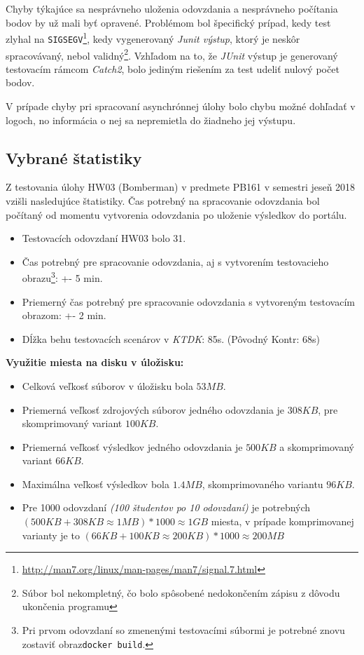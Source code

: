 \documentclass[
  digital, %
  twoside, %
  table,   %
  lof,     %
  lot,     %
]{fithesis3}
\begin{document}
Chyby týkajúce sa nesprávneho uloženia odovzdania a nesprávneho počítania bodov by už mali byť opravené. Problémom bol špecifický prípad, kedy test zlyhal na \texttt{SIGSEGV}\footnote{\url{http://man7.org/linux/man-pages/man7/signal.7.html}}, kedy vygenerovaný \emph{Junit výstup}, ktorý je neskôr spracovávaný, nebol validný\footnote{Súbor bol nekompletný, čo bolo spôsobené nedokončením zápisu z dôvodu ukončenia programu}. Vzhľadom na to, že \emph{JUnit} výstup je generovaný testovacím rámcom \emph{Catch2}, bolo jediným riešením za test udeliť nulový počet bodov.

V prípade chyby pri spracovaní asynchrónnej úlohy bolo chybu možné dohľadať v logoch, no informácia o nej sa nepremietla do žiadneho jej výstupu.

\subsection{Vybrané štatistiky}

Z testovania úlohy HW03 (Bomberman) v predmete PB161 v semestri jeseň 2018 vzišli nasledujúce štatistiky. Čas potrebný na spracovanie odovzdania bol počítaný od momentu vytvorenia odovzdania po uloženie výsledkov do portálu.

\begin{itemize}
    \item Testovacích odovzdaní HW03 bolo 31. 
    \item Čas potrebný pre spracovanie odovzdania, aj s vytvorením testovacieho obrazu\footnote{Pri prvom odovzdaní so zmenenými testovacími súbormi je potrebné znovu zostaviť obraz\texttt{docker build}.}: +- 5 min.
    \item Priemerný čas potrebný pre spracovanie odovzdania s vytvoreným testovacím obrazom: +- 2 min.
    \item Dĺžka behu testovacích scenárov v \emph{KTDK}: 85s. (Pôvodný Kontr: 68s)
\end{itemize}

\textbf{Využitie miesta na disku v úložisku:}

\begin{itemize}
    \item Celková veľkosť súborov v úložisku bola $53MB$.
    \item Priemerná veľkosť zdrojových súborov jedného odovzdania je $308KB$, pre skomprimovaný variant $100KB$.
    \item Priemerná veľkosť výsledkov jedného odovzdania je $500KB$ a skomprimovaný variant $66 KB$.
    \item Maximálna veľkosť výsledkov bola $1.4MB$, skomprimovaného variantu $96KB$.
    \item Pre 1000 odovzdaní \emph{(100 študentov po 10 odovzdaní)} je potrebných $(500 KB + 308KB \approx 1MB) * 1000 \approx 1 GB$ miesta, v prípade komprimovanej varianty je to $(66KB + 100KB \approx 200KB) * 1000 \approx 200MB$
\end{itemize}
 
\end{document}
